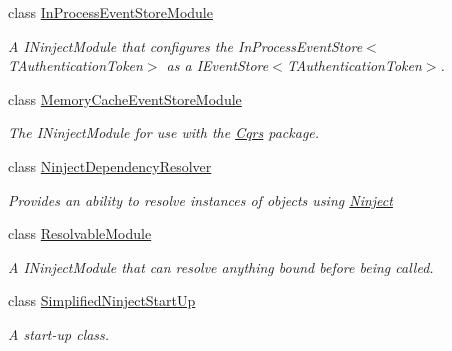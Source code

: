 \begin{DoxyCompactItemize}
class \hyperlink{classCqrs_1_1Ninject_1_1Configuration_1_1InProcessEventStoreModule}{In\+Process\+Event\+Store\+Module}
\begin{DoxyCompactList}\small\item\em A I\+Ninject\+Module that configures the In\+Process\+Event\+Store$<$\+T\+Authentication\+Token$>$ as a I\+Event\+Store$<$\+T\+Authentication\+Token$>$. \end{DoxyCompactList}\item 
class \hyperlink{classCqrs_1_1Ninject_1_1Configuration_1_1MemoryCacheEventStoreModule}{Memory\+Cache\+Event\+Store\+Module}
\begin{DoxyCompactList}\small\item\em The I\+Ninject\+Module for use with the \hyperlink{namespaceCqrs}{Cqrs} package. \end{DoxyCompactList}\item 
class \hyperlink{classCqrs_1_1Ninject_1_1Configuration_1_1NinjectDependencyResolver}{Ninject\+Dependency\+Resolver}
\begin{DoxyCompactList}\small\item\em Provides an ability to resolve instances of objects using \hyperlink{namespaceCqrs_1_1Ninject}{Ninject} \end{DoxyCompactList}\item 
class \hyperlink{classCqrs_1_1Ninject_1_1Configuration_1_1ResolvableModule}{Resolvable\+Module}
\begin{DoxyCompactList}\small\item\em A I\+Ninject\+Module that can resolve anything bound before being called. \end{DoxyCompactList}\item 
class \hyperlink{classCqrs_1_1Ninject_1_1Configuration_1_1SimplifiedNinjectStartUp}{Simplified\+Ninject\+Start\+Up}
\begin{DoxyCompactList}\small\item\em A start-\/up class. \end{DoxyCompactList}\end{DoxyCompactItemize}
